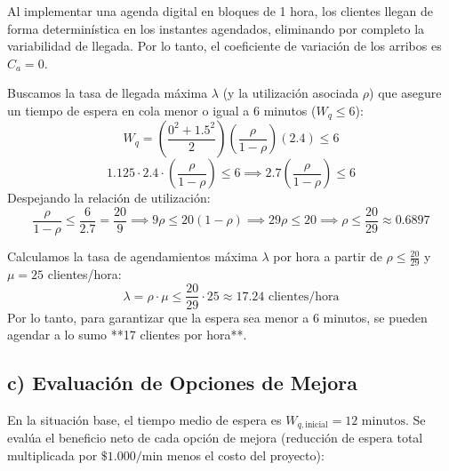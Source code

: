 \documentclass[11pt, a4paper]{article}
\begin{document}
Al implementar una agenda digital en bloques de 1 hora, los clientes llegan de forma determinística en los instantes agendados, eliminando por completo la variabilidad de llegada. Por lo tanto, el coeficiente de variación de los arribos es $C_a = 0$.

Buscamos la tasa de llegada máxima $\lambda$ (y la utilización asociada $\rho$) que asegure un tiempo de espera en cola menor o igual a 6 minutos ($W_q \le 6$):
\[
  W_q = \left( \frac{0^2 + 1.5^2}{2} \right) \left( \frac{\rho}{1 - \rho} \right) \left( 2.4 \right) \le 6
\]
\[
  1.125 \cdot 2.4 \cdot \left( \frac{\rho}{1 - \rho} \right) \le 6 \implies 2.7 \left( \frac{\rho}{1 - \rho} \right) \le 6
\]
Despejando la relación de utilización:
\[
  \frac{\rho}{1 - \rho} \le \frac{6}{2.7} = \frac{20}{9} \implies 9\rho \le 20(1-\rho) \implies 29\rho \le 20 \implies \rho \le \frac{20}{29} \approx 0.6897
\]

Calculamos la tasa de agendamientos máxima $\lambda$ por hora a partir de $\rho \le \frac{20}{29}$ y $\mu = 25$ clientes/hora:
\[
  \lambda = \rho \cdot \mu \le \frac{20}{29} \cdot 25 \approx 17.24 \text{ clientes/hora}
\]
Por lo tanto, para garantizar que la espera sea menor a 6 minutos, se pueden agendar a lo sumo **17 clientes por hora**.

\subsection*{c) Evaluación de Opciones de Mejora}

En la situación base, el tiempo medio de espera es $W_{q,\text{inicial}} = 12 \text{ minutos}$. Se evalúa el beneficio neto de cada opción de mejora (reducción de espera total multiplicada por $\$1.000/\text{min}$ menos el costo del proyecto):
\end{document}
